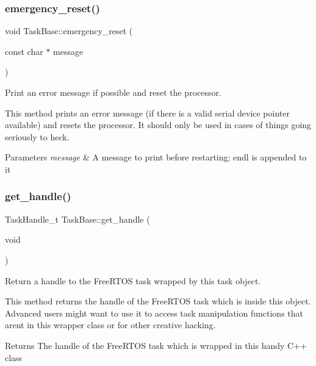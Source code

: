 \subsubsection{\texorpdfstring{emergency\+\_\+reset()}{emergency\_reset()}}
{\footnotesize\ttfamily void Task\+Base\+::emergency\+\_\+reset (\begin{DoxyParamCaption}\item[{const char $\ast$}]{message }\end{DoxyParamCaption})}



Print an error message if possible and reset the processor. 

This method prints an error message (if there is a valid serial device pointer available) and resets the processor. It should only be used in cases of things going seriously to heck. 
\begin{DoxyParams}{Parameters}
{\em message} & A message to print before restarting; {\ttfamily endl} is appended to it \\
\hline
\end{DoxyParams}
\mbox{\label{class_task_base_a2113de68c720fcf8b643b11a43b84ab7}} 
\subsubsection{\texorpdfstring{get\+\_\+handle()}{get\_handle()}}
{\footnotesize\ttfamily Task\+Handle\+\_\+t Task\+Base\+::get\+\_\+handle (\begin{DoxyParamCaption}\item[{void}]{ }\end{DoxyParamCaption})\hspace{0.3cm}{\ttfamily [inline]}}



Return a handle to the Free\+R\+T\+OS task wrapped by this task object. 

This method returns the handle of the Free\+R\+T\+OS task which is inside this object. Advanced users might want to use it to access task manipulation functions that aren\textquotesingle{}t in this wrapper class or for other creative hacking. \begin{DoxyReturn}{Returns}
The handle of the Free\+R\+T\+OS task which is wrapped in this handy C++ class 
\end{DoxyReturn}
\mbox{\label{class_task_base_a6d6efe1287e0d4b73064af05626e48d2}} 
